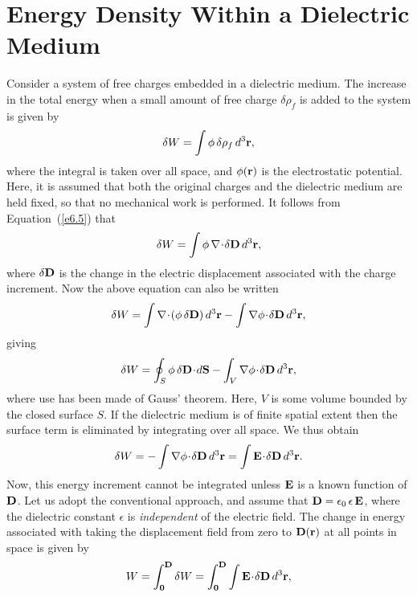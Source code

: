 \section{Energy Density Within a Dielectric Medium}
Consider a system of free charges embedded in a dielectric
medium. The increase  in the total energy when a small
amount  of free  charge $\delta\rho_f$ is added to the system
is given by
\begin{equation}
\delta W = \int \phi \,\delta\rho_f \,d^3{\bf r},
\end{equation}
where the integral is taken over all space,
 and $\phi({\bf r})$ is the
electrostatic potential. 
Here, it is assumed that both the original charges and the dielectric medium are
held fixed, so that no mechanical work is performed.
It follows from Equation~(\ref{e6.5}) that
\begin{equation}\label{e6.35}
\delta W = \int \phi\,\nabla\!\cdot\!\delta {\bf D}\,d^3{\bf r},
\end{equation}
where $\delta{\bf D}$ is the change in the electric displacement associated
with the charge increment. Now the above equation can also be written
\begin{equation}
\delta W = \int \nabla\!\cdot\!(\phi\,\delta{\bf D})\,d^3{\bf r}
- \int \nabla\phi\!\cdot\!\delta{\bf D}\,d^3{\bf r},
\end{equation}
giving
\begin{equation}
\delta W = \oint_S \phi \,\delta{\bf D}\!\cdot\!d{\bf S} -
\int_V \nabla\phi\!\cdot\!\delta{\bf D}\,d^3{\bf r},
\end{equation}
where use has been made of Gauss' theorem. Here, $V$ is some
volume bounded by the closed surface $S$. 
If the dielectric medium
is of finite
spatial extent then the surface term is eliminated by integrating over all space. We thus obtain
\begin{equation}\label{e6.37}
\delta W = -\int\nabla\phi  \!\cdot\!\delta{\bf D}\,d^3{\bf r}
= \int {\bf E}\!\cdot\! \delta {\bf D}\,d^3{\bf r}.
\end{equation}
Now, this energy increment cannot be integrated unless ${\bf E}$ is a known
function of ${\bf D}$. Let us adopt the conventional approach, and assume that
${\bf D} =\epsilon_0\, \epsilon\, {\bf E}$, where the dielectric constant
$\epsilon$ is {\em independent}\/ of the electric field. The
change in energy associated with taking the displacement field from
zero to ${\bf D}({\bf r})$ at all points in space is given by
\begin{equation}
W = \int_{\bf 0}^{\bf D} \delta W = \int_{\bf 0}^{\bf D }\int {\bf E}\!\cdot\!
\delta{\bf D}\,d^3{\bf r},
\end{equation}
